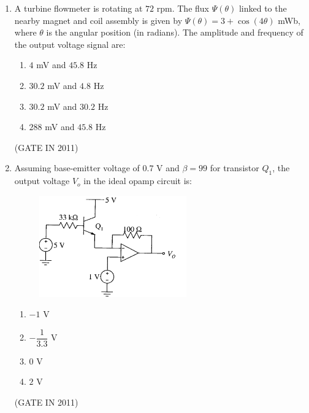 \documentclass[journal]{IEEEtran}
\begin{document}
\begin{enumerate}
\item A turbine flowmeter is rotating at $72$ rpm. The flux $\Psi(\theta)$ linked to the nearby magnet and coil assembly is given by $\Psi(\theta) = 3 + \cos(4\theta)$ mWb, where $\theta$ is the angular position (in radians).  
The amplitude and frequency of the output voltage signal are:
\begin{multicols}{2}
\begin{enumerate}
\item $4$ mV and $45.8$ Hz  
\item $30.2$ mV and $4.8$ Hz  
\item $30.2$ mV and $30.2$ Hz  
\item $288$ mV and $45.8$ Hz
\end{enumerate}
\end{multicols} \hfill(GATE IN 2011)

\item Assuming base-emitter voltage of $0.7$ V and $\beta = 99$ for transistor $Q_1$, the output voltage $V_o$ in the ideal opamp circuit is:
\begin{figure}[H]
    \centering
      \includegraphics[width=0.6\textwidth]{8.png} 
      \caption{}
    \label{fig:fig8} 
\end{figure}
\begin{multicols}{4}
\begin{enumerate}
\item $-1$ V  
\item $-\dfrac{1}{3.3}$ V  
\item $0$ V  
\item $2$ V
\end{enumerate}
\end{multicols} \hfill(GATE IN 2011)


\end{enumerate}
\end{document}
